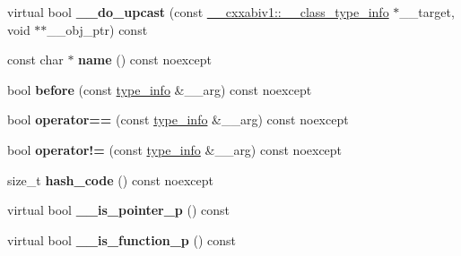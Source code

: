 \begin{DoxyCompactItemize}
\item 
\hypertarget{classstd_1_1type__info_a735e0aef98d6394a37cd9a703c67704c}{virtual bool {\bfseries \+\_\+\+\_\+do\+\_\+upcast} (const \hyperlink{class____cxxabiv1_1_1____class__type__info}{\+\_\+\+\_\+cxxabiv1\+::\+\_\+\+\_\+class\+\_\+type\+\_\+info} $\ast$\+\_\+\+\_\+target, void $\ast$$\ast$\+\_\+\+\_\+obj\+\_\+ptr) const }\label{classstd_1_1type__info_a735e0aef98d6394a37cd9a703c67704c}

\item 
\hypertarget{classstd_1_1type__info_afe60508ee089cebbd056bd50dfc7c3d7}{const char $\ast$ {\bfseries name} () const noexcept}\label{classstd_1_1type__info_afe60508ee089cebbd056bd50dfc7c3d7}

\item 
\hypertarget{classstd_1_1type__info_af2bf0c06826f33947ecd2854d0e2a3bc}{bool {\bfseries before} (const \hyperlink{classstd_1_1type__info}{type\+\_\+info} \&\+\_\+\+\_\+arg) const noexcept}\label{classstd_1_1type__info_af2bf0c06826f33947ecd2854d0e2a3bc}

\item 
\hypertarget{classstd_1_1type__info_a30078bc4dfd24fedee91bca264a0507c}{bool {\bfseries operator==} (const \hyperlink{classstd_1_1type__info}{type\+\_\+info} \&\+\_\+\+\_\+arg) const noexcept}\label{classstd_1_1type__info_a30078bc4dfd24fedee91bca264a0507c}

\item 
\hypertarget{classstd_1_1type__info_aaf0f927a29840cbfd0d1f2c435160c93}{bool {\bfseries operator!=} (const \hyperlink{classstd_1_1type__info}{type\+\_\+info} \&\+\_\+\+\_\+arg) const noexcept}\label{classstd_1_1type__info_aaf0f927a29840cbfd0d1f2c435160c93}

\item 
\hypertarget{classstd_1_1type__info_a4c297cf60f7d03092b7ba7632877eac9}{size\+\_\+t {\bfseries hash\+\_\+code} () const noexcept}\label{classstd_1_1type__info_a4c297cf60f7d03092b7ba7632877eac9}

\item 
\hypertarget{classstd_1_1type__info_a04a004605c917f1ba088cfac11955808}{virtual bool {\bfseries \+\_\+\+\_\+is\+\_\+pointer\+\_\+p} () const }\label{classstd_1_1type__info_a04a004605c917f1ba088cfac11955808}

\item 
\hypertarget{classstd_1_1type__info_a92e431500c93d1a7cb7952c5142ebadc}{virtual bool {\bfseries \+\_\+\+\_\+is\+\_\+function\+\_\+p} () const }\label{classstd_1_1type__info_a92e431500c93d1a7cb7952c5142ebadc}


\end{DoxyCompactItemize}
